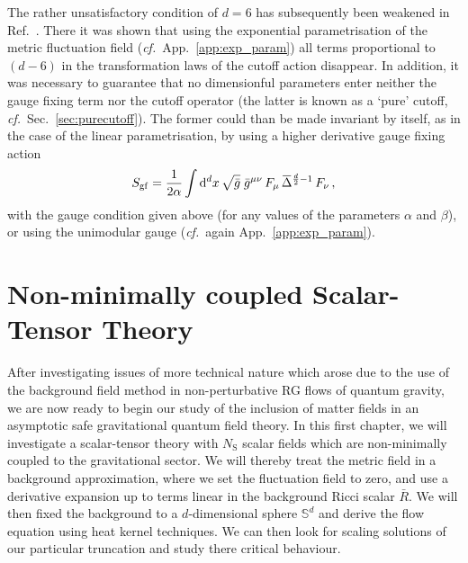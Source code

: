 \documentclass[11pt]{book}
\newcommand{\overbar}[1]{\mkern 1.5mu\overline{\mkern-1.5mu#1\mkern-1.5mu}\mkern 1.5mu}
\newcommand\NS{ N_{\scriptscriptstyle{\mathrm{S}}} }
\newcommand\cf{\textit{cf.}\ }
\numberwithin{equation}{chapter}
\begin{document}
The rather unsatisfactory condition of $d=6$ has subsequently been weakened in
Ref.~\cite{Percacci:2016arh}. There it was shown that using the exponential
parametrisation of the metric fluctuation field (\cf App.~\ref{app:exp_param})
all terms proportional to $(d-6)$ in the transformation laws of the cutoff action
disappear. In addition, it was necessary to guarantee that no dimensionful
parameters enter neither the gauge fixing term nor the cutoff operator
(the latter is known as a `pure' cutoff, \cf Sec.~\ref{sec:purecutoff}).
The former could than
be made invariant by itself, as in the case of the linear parametrisation,
by using a higher derivative gauge fixing action
\begin{align}
  S_\mathrm{gf} = \frac{1}{2\alpha} \int \mathrm d^dx \, \sqrt{\bar g} \;
  \bar g^{\mu\nu} \, F_\mu \, \overbar \Delta^{\frac d2 - 1} \, F_\nu \,,
\end{align}
with the gauge condition given above (for any values of the parameters
$\alpha$ and $\beta$), or using the unimodular gauge (\cf again
App.~\ref{app:exp_param}).




\chapter{Non-minimally coupled Scalar-Tensor Theory}
\label{ch:scalartensor}

After investigating issues of more technical nature which arose due to
the use of the background field method in non-perturbative RG flows
of quantum gravity, we are now ready to begin our study of the inclusion of
matter fields in an asymptotic safe gravitational quantum field theory.
In this first chapter, we will investigate a scalar-tensor theory
with $\NS$ scalar fields which are non-minimally coupled to the
gravitational sector. We will thereby treat the metric field in a background
approximation, where we set the fluctuation field to zero, and use
a derivative expansion up to terms linear in the background Ricci
scalar $\bar R$. We will then fixed the background to a $d$-dimensional
sphere $\mathbb S^d$ and derive the flow equation using heat kernel
techniques. We can then look for scaling solutions of our particular truncation
and study there critical behaviour.
\end{document}
